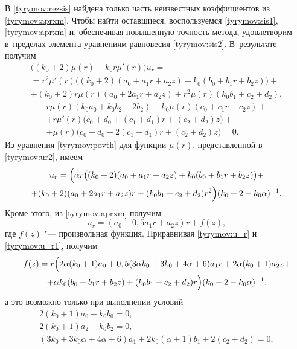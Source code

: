  В \eqref{tyrymov:rezsis} найдена только часть неизвестных коэффициентов из \eqref{tyrymov:aprxm}. 
 Чтобы найти оставшиеся, воспользуемся \eqref{tyrymov:sis1}, \eqref{tyrymov:aprxm} и,
обеспечивая повышенную точность метода, удовлетворим в~пределах элемента уравнениям равновесия \eqref{tyrymov:sis2}. 
В~результате получим
\begin{multline}\label{tyrymov:povth}
      \bigl((k_0+2)\mu(r)-k_0r\mu'(r)\bigr) u_r= \\
       =r^2\mu'(r)\bigl((k_0+2)(a_0+a_1r+a_2z)+
           k_0(b_0+b_1r+b_2z)\bigr) + \\+(k_0+2)r\mu(r)(a_0+2a_1r+a_2z)+ r^2\mu(r)(k_0b_1+c_2+d_2),
\end{multline}
\begin{multline}\label{tyrymov:povth1}
      r\mu(r)(k_0a_0+k_0b_2+2b_2)+k_0\mu(r)(c_0+c_1r+c_2z)+ \\ 
      +r\mu'(r)\bigl(c_0+d_0+ (c_1+d_1)r+(c_2+d_2)z\bigr)+ \\
       + \mu(r)\bigl(c_0+d_0+2(c_1+d_1)r+(c_2+d_2)z\bigr)=0.
\end{multline}
Из уравнения \eqref{tyrymov:povth} для функции $\mu(r)$, представленной в \eqref{tyrymov:ur2}, имеем
\begin{multline}\label{tyrymov:u_r}
      u_r=\Bigl(\alpha r\bigl((k_0+2)(a_0+a_1r+a_2z)+k_0(b_0+b_1r+b_2z)\bigr)+
      \\
      +(k_0+2)(a_0+2a_1r+a_2z)r+(k_0b_1+c_2+d_2)r^2\Bigr)(k_0+2-k_0\alpha)^{-1}.
\end{multline}
 Кроме этого, из \eqref{tyrymov:aprxm} получим
\begin{equation}\label{tyrymov:u_r1}
      u_r=(a_0+0,5a_1r+a_2z)r+f(z),
\end{equation}
где $f(z)$ "--- произвольная функция. Приравнивая
\eqref{tyrymov:u_r} и \eqref{tyrymov:u_r1}, получим
\begin{multline*}
      f(z)=r\Bigl(2\alpha(k_0+1)a_0+0,5(3\alpha k_0+3k_0+4\alpha+6)a_1r  +2\alpha(k_0+1)a_2z+ \\ + \alpha
      k_0(b_0+b_1r+b_2z)+(k_0b_1+c_2+d_2)r\Bigr)(k_0+2-k_0\alpha)^{-1},
\end{multline*}
а это возможно только при выполнении условий
\begin{gather}
\label{tyrymov:us1}
    2(k_0+1)a_0+k_0b_0=0,
\\
\label{tyrymov:us2}
    2(k_0+1)a_2+k_0b_2=0,
\\
\label{tyrymov:us3}
    (3k_0+3k_0\alpha+4\alpha+6)a_1+2k_0(\alpha+1)b_1+2(c_2+d_2)=0,
\end{gather}
